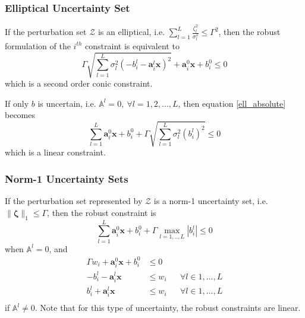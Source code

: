 \subsubsection{Elliptical Uncertainty Set}
If the perturbation set $\mathcal{Z}$ is an elliptical, i.e. $\textstyle{\sum}_{l=1}^L\frac{\zeta_l^2}{\sigma_l^2} \leq \Gamma^2$,
then the robust formulation of the $i^{th}$ constraint is equivalent to
\begin{equation}
\Gamma \sqrt{\textstyle{\sum}_{l=1}^L \sigma_l^2(- b^l_{i} - \mathbf{a}^l_{i}\mathbf{x})^2} + \mathbf{a}^0_{i}\mathbf{x} + b^0_{i} \leq 0
\label{ell_absolute}
\end{equation}
which is a second order conic constraint.

If only $b$ is uncertain, i.e. $\mathbb{A}^l = 0,~\forall l = 1,2,...,L$, then equation \eqref{ell_absolute} becomes
\begin{equation}
\textstyle{\sum}_{l=1}^L \mathbf{a}^0_{i}\mathbf{x} + b^0_{i} + \Gamma \sqrt{\textstyle{\sum}_{l=1}^L \sigma_l^2(b^l_{i})^2} \leq 0
\label{ell_coeff}
\end{equation}
which is a linear constraint.

\subsubsection{Norm-1 Uncertainty Sets}

If the perturbation set represented by $\mathcal{Z}$ is a norm-1 uncertainty set, i.e. $\|\mathbf{\zeta}\|_1 \leq \Gamma$,
then the robust constraint is
\begin{equation}
\textstyle{\sum}_{l=1}^L \mathbf{a}^0_{i}\mathbf{x} + b^0_{i} + \Gamma \max_{l=1,..,L} |b^l_{i}| \leq 0
\label{rom_coeff}
\end{equation}
when $\mathbb{A}^l = 0$, and 
\begin{equation}
\begin{aligned}
\Gamma w_{i} + \mathbf{a}^0_{i}\mathbf{x} + b^0_{i} &\leq 0\\
- b^l_{i} - \mathbf{a}^l_{i}\mathbf{x} &\leq w_{i} &&\forall l \in 1,...,L\\
b^l_{i} + \mathbf{a}^l_{i}\mathbf{x} &\leq w_{i} &&\forall l \in 1,...,L\\
\end{aligned}
\label{rom_linear}
\end{equation}
if $\mathbb{A}^l \neq 0$. Note that for this type of uncertainty, the robust constraints are linear.
